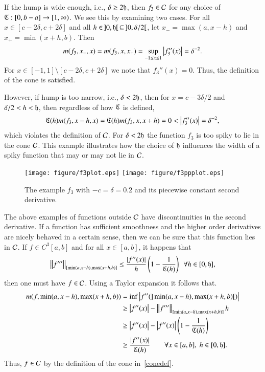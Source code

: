 \documentclass[review]{elsarticle}
\theoremstyle{definition}
\begin{document}
If the hump is wide enough, i.e., $\delta \ge 2 \fh$, then $f_3 \in \cc$ for
any choice of $\fC : [0,b-a] \to [1,\infty)$.  We see this by examining two cases.  For all $x \in [c - 2 \delta, c + 2 \delta]$ and all $h \in \, ]0,\fh[ \, \subseteq \, ]0,\delta/2[$, let $x_- = \max(a, x -h)$ and $x_+ = \min(x +h,b)$.  Then
\[
m(f_3,x_-,x) = m(f_3,x,x_+) = \sup_{-1 \le x \le 1} \abs{f_3''(x)}  = \delta^{-2}.
\]
For $x \in [-1,1] \setminus [c - 2 \delta , c + 2 \delta]$ we note that $f_3''(x) = 0$. Thus, the definition of the cone is satisfied.

However, if hump is too narrow, i.e.,  $\delta < 2 \fh$, then for $x = c-3\delta/2$ and $\delta/2 < h < \fh$, then regardless of how $\fC$ is defined,
\[
\fC(h)m(f_3,x - h,x)=\fC(h)m(f_3,x,x+h)=0 < \abs{f''_3(x)} = \delta^{-2},
\]
which violates the definition of $\cc$.  For $\delta < 2 \fh$ the function $f_3$ is too spiky to lie in the cone $\cc$.   This example illustrates how the choice of $\fh$ influences the width of
a spiky function that may or may not lie in $\cc$.

\begin{figure}[t]
\centering
\texttt{[image: figure/f3plot.eps]} \quad
\texttt{[image: figure/f3ppplot.eps]}
\caption{The example $f_3$ with $-c=\delta = 0.2$  and its piecewise constant second derivative. \label{f3fig}}
\end{figure}

The above examples of functions outside $\cc$ have discontinuities in the second
derivative.  If a function has sufficient smoothness and the higher order derivatives are nicely behaved in a certain sense, then we can be sure that this function lies in $\cc$.   If  $f \in C^3[a,b]$ and for all $x \in [a,b]$, it happens that
\begin{equation} \label{conesuffconda}
\norm[{[\min(a,x-h),\max(x+h,b)]}]{f'''} \le \frac{\abs{f''(x)}}{h} \left( 1 - \frac{1}{\fC(h)} \right) \ \ \forall h \in [0,\fh],
\end{equation}
then one must have $f \in \cc$.  Using a Taylor expansion it follows that.
\begin{align*}
m(f,\min(a,x-h),\max(x+h,b)) & = \inf \abs{f''(]\min(a,x-h),\max(x+h,b)[)} \\
& \ge \abs{f''(x)}  - \norm[{[\min(a,x-h),\max(x+h,b)]}]{f'''}h \\
& \ge \abs{f''(x)}  - \abs{f''(x)}\left( 1 - \frac{1}{\fC(h)} \right) \\
& \ge \frac{\abs{f''(x)}}{\fC(h)} \qquad \forall x \in [a,b],\ h \in [0,\fh].
\end{align*}
Thus, $f \in \cc$ by the definition of the cone in~\eqref{conedef}.
\end{document}
